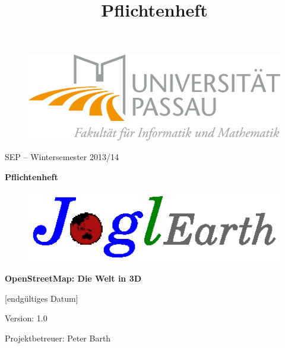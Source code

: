 \documentclass[10pt]{report}
\begin{document}
\title{Pflichtenheft}

\begin{figure}
	\begin{flushright}
		\vspace{2.0 cm}
		\includegraphics[scale=0.5]{uniLogo.png}
	\end{flushright}
\end{figure}
\begin{center}
\vspace{2.0 cm}
{\LARGE SEP – Wintersemester 2013/14}

\vspace{1.0 cm}
\textbf{{\Huge Pflichtenheft}}

\vspace{0.5 cm}
\begin{figure}[!htb]
\begin{center}
	\includegraphics[scale=1.0]{projektLogo.eps}
\end{center}
\end{figure}

\vspace{0.5 cm}
\textbf{{\Huge OpenStreetMap: Die Welt in 3D}}

\vspace{1.5 cm}
[endgültiges Datum]

\vspace{0.5 cm}
Version: 1.0

\vspace{1.5 cm}
{\Large Projektbetreuer: Peter Barth}


\end{center}
\end{document}
